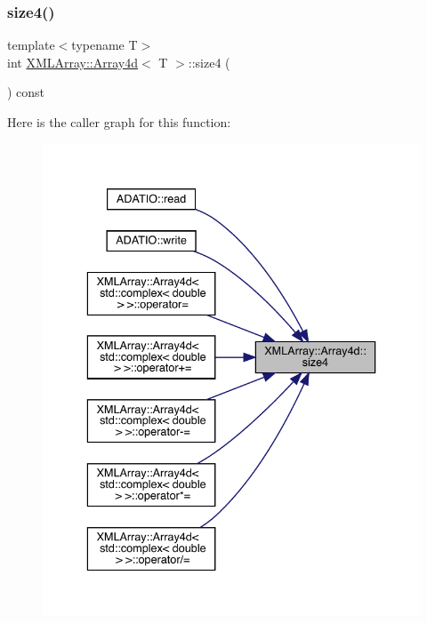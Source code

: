 \mbox{\label{classXMLArray_1_1Array4d_abcaa3187b7b1b4b36997937c7597f393}} 
\subsubsection{\texorpdfstring{size4()}{size4()}\hspace{0.1cm}{\footnotesize\ttfamily [1/2]}}
{\footnotesize\ttfamily template$<$typename T$>$ \\
int \mbox{\hyperlink{classXMLArray_1_1Array4d}{X\+M\+L\+Array\+::\+Array4d}}$<$ T $>$\+::size4 (\begin{DoxyParamCaption}{ }\end{DoxyParamCaption}) const\hspace{0.3cm}{\ttfamily [inline]}}

Here is the caller graph for this function\+:\nopagebreak
\begin{figure}[H]
\begin{center}
\leavevmode
\includegraphics[width=336pt]{de/d16/classXMLArray_1_1Array4d_abcaa3187b7b1b4b36997937c7597f393_icgraph}
\end{center}
\end{figure}
\mbox{\label{classXMLArray_1_1Array4d_abcaa3187b7b1b4b36997937c7597f393}} 
